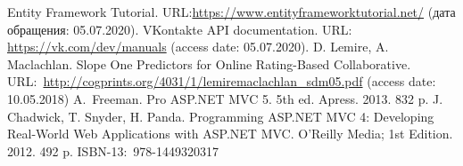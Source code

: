 \documentclass[conference]{IEEEtran}
\begin{document}
\begin{thebibliography}{99}
Entity Framework Tutorial. URL:\url{https://www.entityframeworktutorial.net/} (дата обращения: 05.07.2020).
VKontakte API documentation. URL: \url{https://vk.com/dev/manuals} (access date: 05.07.2020).
 D. Lemire, A. Maclachlan. Slope One Predictors for Online Rating-Based Collaborative. URL:~\url{http://cogprints.org/4031/1/lemiremaclachlan_sdm05.pdf} (access date: 10.05.2018)
A.~Freeman. Pro ASP.NET MVC 5. 5th ed. Apress. 2013. 832 p. 
 J. Chadwick, T. Snyder, H. Panda. Programming ASP.NET MVC 4: Developing Real-World Web Applications with ASP.NET MVC.  O'Reilly Media; 1st Edition. 2012. 492 p.  ISBN-13:~978-1449320317
\end{thebibliography}
\end{document}
